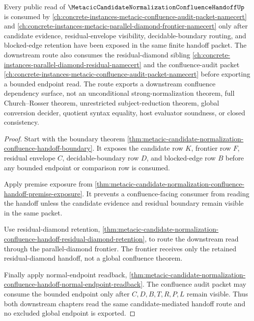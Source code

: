 \begin{theorem}
\label{thm:metacic-candidate-normalization-confluence-handoff-orphan-route}
Every public read of $\MetacicCandidateNormalizationConfluenceHandoffUp$ is consumed by \autoref{ch:concrete-instances-metacic-confluence-audit-packet-namecert} and \autoref{ch:concrete-instances-metacic-parallel-diamond-frontier-namecert} only after candidate evidence, residual-envelope visibility, decidable-boundary routing, and blocked-edge retention have been exposed in the same finite handoff packet. The downstream route also consumes the residual-diamond sibling \autoref{ch:concrete-instances-parallel-diamond-residual-namecert} and the confluence-audit packet \autoref{ch:concrete-instances-metacic-confluence-audit-packet-namecert} before exporting a bounded endpoint read. The route exports a downstream confluence dependency surface, not an unconditional strong-normalization theorem, full Church--Rosser theorem, unrestricted subject-reduction theorem, global conversion decider, quotient syntax equality, host evaluator soundness, or closed consistency.
\end{theorem}
\begin{proof}
Start with the boundary theorem \autoref{thm:metacic-candidate-normalization-confluence-handoff-boundary}. It exposes the candidate row $K$, frontier row $F$, residual envelope $C$, decidable-boundary row $D$, and blocked-edge row $B$ before any bounded endpoint or comparison row is consumed.

Apply premise exposure from \autoref{thm:metacic-candidate-normalization-confluence-handoff-premise-exposure}. It prevents a confluence-facing consumer from reading the handoff unless the candidate evidence and residual boundary remain visible in the same packet.

Use residual-diamond retention, \autoref{thm:metacic-candidate-normalization-confluence-handoff-residual-diamond-retention}, to route the downstream read through the parallel-diamond frontier. The frontier receives only the retained residual-diamond handoff, not a global confluence theorem.

Finally apply normal-endpoint readback, \autoref{thm:metacic-candidate-normalization-confluence-handoff-normal-endpoint-readback}. The confluence audit packet may consume the bounded endpoint only after $C,D,B,T,R,P,L$ remain visible. Thus both downstream chapters read the same candidate-mediated handoff route and no excluded global endpoint is exported.
\end{proof}

